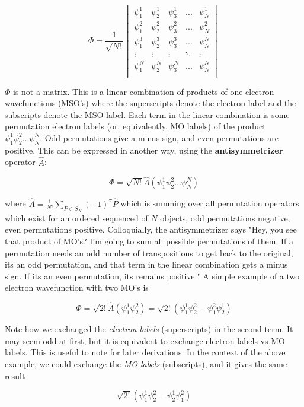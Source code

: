 \documentclass[11pt]{article}
\begin{document}
\[\Phi = \frac{1}{\sqrt{N!}} \begin{vmatrix}
\psi_1^1 & \psi_2^1 & \psi_3^1 & ...  & \psi_N^1 \\
\psi_1^2 & \psi_2^2 & \psi_3^2 & ...  & \psi_N^2 \\
\psi_1^3 & \psi_2^3 & \psi_3^3  &...    & \psi_N^N \\
\vdots & \vdots & \vdots & \ddots &  \vdots \\
\psi_1^N & \psi_2^N & \psi_3^N  &...    & \psi_N^N \\
\end{vmatrix}\]

$\Phi$ is not a matrix. This is a linear combination of products of one
electron wavefunctions (MSO's) where the superscripts denote the electron
label and the subscripts denote the MSO label. Each term in the linear
combination is some permutation electron labels (or, equivalently, MO
labels) of the product \(\psi_1^1 \psi_2^2 \dots \psi_N^N\). Odd
permutations give a minus sign, and even permutations are positive. This
can be expressed in another way, using the \textbf{antisymmetrizer}
operator \(\hat{A}\):

\[\Phi = \sqrt{N!} \hat{A} (\psi_1^1 \psi_2^2 \dots \psi_N^N)\]

where \(\hat{A} = \frac{1}{N!} \sum\limits_{P \in S_N} (-1)^{\pi} \hat{P}\)
which is summing over all permutation operators which exist for an
ordered sequenced of \(N\) objects, odd permutations negative, even
permutations positive. Colloquially, the antisymmetrizer says "Hey, you
see that product of MO's? I'm going to sum all possible permutations of
them. If a permutation needs an odd number of transpositions to get back
to the original, its an odd permutation, and that term in the linear
combination gets a minus sign. If its an even permutation, its remains
positive." A simple example of a two electron wavefunction with two MO's
is

\[\Phi = \sqrt{2!} \hat{A} (\psi_1^1 \psi_2^2) = \sqrt{2!}( \psi_1^1 \psi_2^2 - \psi_1^2 \psi_2^1)\]

Note how we exchanged the \emph{electron labels} (superscripts) in the
second term. It may seem odd at first, but it is equivalent to exchange
electron labels vs MO labels. This is useful to note for later
derivations. In the context of the above example, we could exchange the
\emph{MO labels} (subscripts), and it gives the same result

\[\sqrt{2!}( \psi_1^1 \psi_2^2 - \psi_2^1 \psi_1^2)\]
\end{document}

